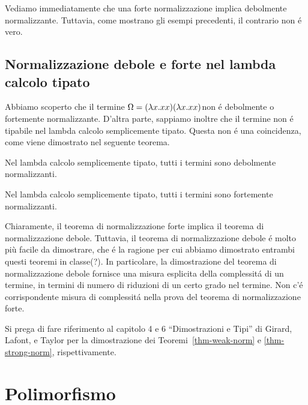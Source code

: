 \documentclass{article}
\begin{document}
Vediamo immediatamente che una forte normalizzazione implica debolmente
normalizzante. Tuttavia, come mostrano gli esempi precedenti, il contrario non \'e
vero.

\subsection{Normalizzazione debole e forte nel lambda calcolo tipato}

Abbiamo scoperto che il termine $\Omega=(\lambda x.xx)(\lambda x.xx)$non \'e debolmente
o fortemente normalizzante. D'altra parte, sappiamo inoltre che
il termine non \'e tipabile nel lambda calcolo semplicemente tipato. Questa non \'e
una coincidenza, come viene dimostrato nel seguente teorema.

\begin{theorem}\label{thm-weak-norm}
  Nel  lambda calcolo semplicemente tipato, tutti i termini sono debolmente
   normalizzanti.
\end{theorem}

\begin{theorem}\label{thm-strong-norm}
  Nel  lambda calcolo semplicemente tipato, tutti i termini sono fortemente
   normalizzanti.
\end{theorem}

Chiaramente, il  teorema di normalizzazione forte implica il 
teorema di normalizzazione debole. Tuttavia, il  teorema di normalizzazione debole \'e molto
più facile da dimostrare, che \'e la ragione per cui abbiamo dimostrato entrambi questi teoremi in
classe(?). In particolare, la dimostrazione del teorema di normalizzazione debole 
fornisce una misura esplicita della complessit\'a di un termine, in termini di
numero di riduzioni di un certo grado nel termine. Non c'\'e
corrispondente misura di complessit\'a nella prova del
teorema di normalizzazione forte.

Si prega di fare riferimento al capitolo 4 e 6  ``Dimostrazioni e Tipi'' di
Girard, Lafont, e Taylor {\cite{GLT89}} per la dimostrazione dei 
Teoremi~\ref{thm-weak-norm} e {\ref{thm-strong-norm}},
rispettivamente. 

\section{Polimorfismo}
\end{document}
